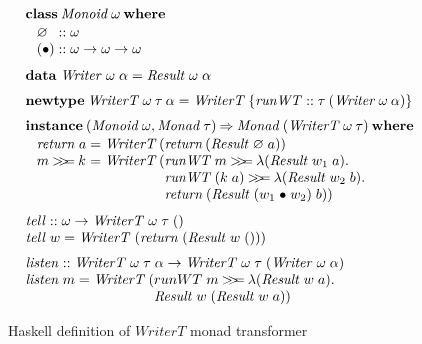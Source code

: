 \documentclass{sigplanconf}
\newcommand{\hsbind}{\mathbin{>\mkern-6mu>\mkern-6.5mu=}}
\newcommand{\To}{\mathbin{\Rightarrow}}
\newcommand{\mempty}{\varnothing}
\newcommand{\mappend}{\mathrel{\bullet}}
\newcommand{\kwd}[1]{\mathbf{#1}}
\newcommand{\hsc}[1]{\ensuremath{\mathit{#1}}}
\newcommand{\tA}{\alpha}
\newcommand{\tT}{\tau}
\newcommand{\tW}{\omega}
\theoremstyle{definition}
\begin{document}
\begin{figure}
\begin{align*}
  & \kwd{class}\:\hsc{Monoid}\:\tW\:\kwd{where} \\[-\jot]
  & \hspace{8pt}
  \begin{alignedat}{2}
    & \mempty &&:: \tW \\[-\jot]
    & (\mappend) &&:: \tW \to \tW \to \tW
  \end{alignedat}
  \\[\jot]
  & \kwd{data}\;\hsc{Writer}\;\tW\;\tA = \hsc{Result}\;\tW\;\tA
  \\[\jot]
  & \kwd{newtype}\:\hsc{WriterT}\:\tW\:\tT\:\tA
  = \hsc{WriterT}\:\{ \hsc{runWT} :: \tT\:(\hsc{Writer}\:\tW\:\tA) \}
  \\[\jot]
  & \kwd{instance}\:(\hsc{Monoid}\:\tW, \hsc{Monad}\:\tT) \To \hsc{Monad}\:(\hsc{WriterT}\:\tW\:\tT)\:\kwd{where}
  \\[-\jot]
  & \hspace{8pt}
  \begin{alignedat}{2}
    & \hsc{return}\;a &&= \hsc{WriterT}\,(\hsc{return}\,(\hsc{Result}\;\mempty\;a)) \\[-\jot]
    & m \hsbind k &&= \hsc{WriterT}\,(
    \begin{aligned}[t]
      & \hsc{runWT}\:m \hsbind \lambda(\hsc{Result}\;w_1\;a). \\[-\jot]
      & \hsc{runWT}\:(k\;a) \hsbind \lambda(\hsc{Result}\;w_2\;b). \\[-\jot]
      & \hsc{return}\:(\hsc{Result}\;(w_1 \mappend w_2)\;b))
    \end{aligned}
  \end{alignedat}
  \\[\jot]
  & \hsc{tell} :: \tW \to \hsc{WriterT}\;\tW\;\tT\;() \\[-\jot]
  & \hsc{tell}\;w = \hsc{WriterT}\;(\hsc{return}\;(\hsc{Result}\;w\;()))
  \\[\jot]
  & \hsc{listen} :: \hsc{WriterT}\;\tW\;\tT\;\tA \to \hsc{WriterT}\;\tW\;\tT\;(\hsc{Writer}\;\tW\;\tA) \\[-\jot]
  & \hsc{listen}\;m = \hsc{WriterT}\:(
  \begin{aligned}[t]
    & runWT\;m \hsbind \lambda(\hsc{Result}\;w\;a). \\[-\jot]
    & \hsc{Result}\;w\;(\hsc{Result}\;w\;a))
  \end{aligned}
\end{align*}
\caption{Haskell definition of \hsc{WriterT} monad transformer}
\label{fig:writerT}
\end{figure}
\end{document}
